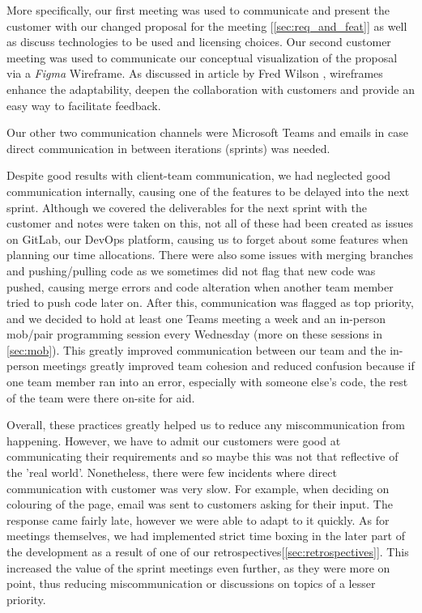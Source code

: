 \documentclass{l3proj}
\begin{document}
        

        

        More specifically, our first meeting was used to communicate and present the customer with our changed proposal for the meeting [\ref{sec:req_and_feat}] as well as discuss technologies to be used and licensing choices. Our second customer meeting was used to communicate our conceptual visualization of the proposal via a \textit{Figma} Wireframe. As discussed in article by Fred Wilson \cite{wireframe}, wireframes enhance the adaptability, deepen the collaboration with customers and provide an easy way to facilitate feedback.
        

        

        Our other two communication channels were Microsoft Teams and emails in case direct communication in between iterations (sprints) was needed.
        
        

        

        Despite good results with client-team communication, we had neglected good communication internally, causing one of the features to be delayed into the next sprint. Although we covered the deliverables for the next sprint with the customer and notes were taken on this, not all of these had been created as issues on GitLab, our DevOps platform, causing us to forget about some features when planning our time allocations. There were also some issues with merging branches and pushing/pulling code as we sometimes did not flag that new code was pushed, causing merge errors and code alteration when another team member tried to push code later on. After this, communication was flagged as top priority, and we decided to hold at least one Teams meeting a week and an in-person mob/pair programming session every Wednesday (more on these sessions in \ref{sec:mob}). This greatly improved communication between our team and the in-person meetings greatly improved team cohesion and reduced confusion because if one team member ran into an error, especially with someone else's code, the rest of the team were there on-site for aid.
        
        

        

        Overall, these practices greatly helped us to reduce any miscommunication from happening. However, we have to admit  our customers were good at communicating their requirements and so maybe this was not that reflective of the 'real world'. Nonetheless, there were few incidents where direct communication with customer was very slow. For example, when deciding on colouring of the page, email was sent to customers asking for their input. The response came fairly late, however we were able to adapt to it quickly. As for meetings themselves, we had implemented strict time boxing in the later part of the development as a result of one of our retrospectives[\ref{sec:retrospectives}]. This increased the value of the sprint meetings even further, as they were more on point, thus reducing miscommunication or discussions on topics of a lesser priority.
\end{document}
